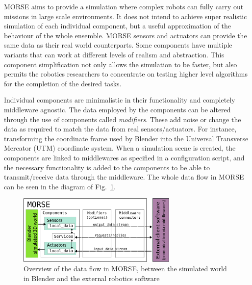 \documentclass{llncs}
\newcommand{\serge}[1]{\nb{Serge}{blue}{#1}}
\begin{document}
MORSE aims to provide a simulation where complex robots can fully
carry out missions in large scale environments.
It does not intend to achieve super realistic simulation of each individual
component, but a useful approximation of the behaviour of the whole ensemble.
MORSE sensors and actuators can provide the same data as their real
world counterparts. Some components have multiple variants that can work
at different levels of realism and abstraction. This component simplification
not only allows the simulation to be faster, but also permits the robotics
researchers to concentrate on testing higher level algorithms for the
completion of the desired tasks.

Individual components are minimalistic in their functionality and  completely
middleware agnostic.
The data employed by the components can be altered through the use of
components called \emph{modifiers}. These add noise or change the data as
required to match the data from real sensors/actuators. For instance,
transforming the coordinate frame used by Blender into the Universal Transverse
Mercator (UTM) coordinate system.
When a simulation scene is created, the components are linked to middlewares as
specified in a configuration script, and the necessary functionality is added
to the components to be able to transmit/receive data through the middleware.
The whole data flow in MORSE can be seen in the diagram of
Fig.~\ref{fig:dataflow}.

\begin{figure}[ht!]
\centering
    \includegraphics[width=0.7\textwidth]{pics/simulation_main_loop-may2012.png}
\caption{Overview of the data flow in MORSE, between the simulated world
    in Blender and the external robotics software}
\label{fig:dataflow}
\end{figure}
\end{document}
